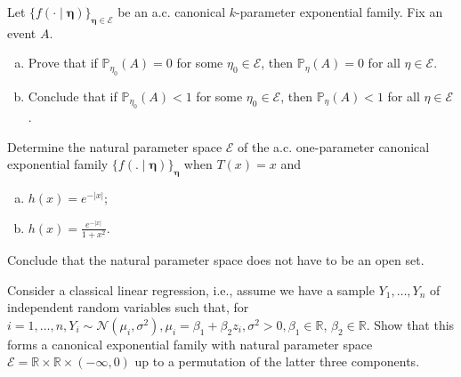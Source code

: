 \begin{exercise}
    Let \(\{f(\cdot \mid \boldsymbol{\eta})\}_{\boldsymbol{\eta} \in \mathcal{E}}\) be an a.c. canonical \(k\)-parameter exponential family. Fix an event \(A\). 
    \begin{enumerate}[(a)]
        \item Prove that if \(\mathbb{P}_{\eta_{0}}(A)=0\) for some \(\eta_{0} \in \mathcal{E}\), then \(\mathbb{P}_{\eta}(A)=0\) for all \(\eta \in \mathcal{E}\). 
        \item Conclude that if \(\mathbb{P}_{\eta_{0}}(A)<1\) for some \(\eta_{0} \in \mathcal{E}\), then \(\mathbb{P}_{\eta}(A)<1\) for all \(\eta \in \mathcal{E}\).
    \end{enumerate}
\end{exercise}

\begin{exercise}
    Determine the natural parameter space \(\mathcal{E}\) of the a.c. one-parameter canonical exponential family \(\{f(. \mid \boldsymbol{\eta})\}_{\boldsymbol{\eta}}\) when \(T(x)=x\) and
    \begin{enumerate}[(a)]
        \item \(h(x)=e^{-|x|}\);
        \item \(h(x)=\frac{e^{-|x|}}{1+x^{2}}\).
    \end{enumerate}
    Conclude that the natural parameter space does not have to be an open set.
\end{exercise}


\begin{exercise}
    Consider a classical linear regression, i.e., assume we have a sample \(Y_{1}, \ldots, Y_{n}\) of independent random variables such that, for \(i=1, \ldots, n, Y_{i} \sim \mathcal{N}\left(\mu_{i}, \sigma^{2}\right), \mu_{i}=\beta_{1}+\beta_{2} z_{i}, \sigma^{2}>0, \beta_{1} \in \mathbb{R}\), \(\beta_{2} \in \mathbb{R}\). Show that this forms a canonical exponential family with natural parameter space \(\mathcal{E}=\mathbb{R} \times \mathbb{R} \times(-\infty, 0)\) up to a permutation of the latter three components.
\end{exercise}